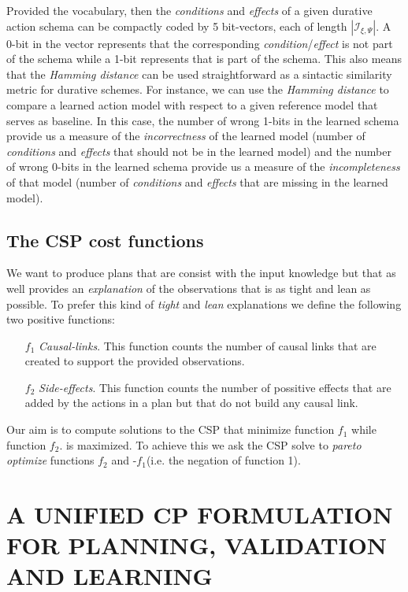 \documentclass{ecai}
\begin{document}
Provided the vocabulary, then the {\em conditions} and {\em effects} of a given durative action schema can be compactly coded by 5 bit-vectors, each of length $|{\mathcal I}_{\xi,\Psi}|$. A 0-bit in the vector represents that the corresponding {\em condition}/{\em effect} is not part of the schema while a 1-bit represents that is part of the schema. This also means that the {\em Hamming distance} can be used straightforward as a sintactic similarity metric for durative schemes. For instance, we can use the {\em Hamming distance} to compare a learned action model with respect to a given reference model that serves as baseline. In this case, the number of wrong 1-bits in the learned schema provide us a measure of the {\em incorrectness} of the learned model (number of {\em conditions} and {\em effects} that should not be in the learned model) and the number of wrong 0-bits in the learned schema provide us a measure of the {\em incompleteness} of that model (number of {\em conditions} and {\em effects} that are missing in the learned model). 

\subsection{The CSP cost functions}
We want to produce plans that are consist with the input knowledge but that as well provides an {\em explanation} of the observations that is as tight and lean as possible. To prefer this kind of {\em tight} and {\em lean} explanations we define the following two positive functions:
\begin{enumerate}
\item[$f_1$] {\em Causal-links}. This function counts the number of causal links that are created to support the provided observations.
\item[$f_2$] {\em Side-effects}. This function counts the number of possitive effects that are added by the actions in a plan but that do not build any causal link.  
\end{enumerate}

Our aim is to compute solutions to the CSP that minimize function $f_1$ while function $f_2$. is maximized. To achieve this we ask the CSP solve to {\em pareto optimize} functions $f_2$ and -$f_1$(i.e. the negation of function 1). 
  






\section{A UNIFIED CP FORMULATION FOR PLANNING, VALIDATION AND LEARNING}
\label{sec:usingCPValidation}
\end{document}
